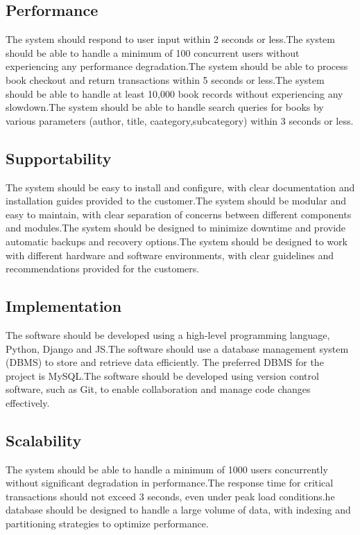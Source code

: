 \subsection{Performance}
The system should respond to user input within 2 seconds or less.The system should be able to handle a minimum of 100 concurrent users without experiencing any performance degradation.The system should be able to process book checkout and return transactions within 5 seconds or less.The system should be able to handle at least 10,000 book records without experiencing any slowdown.The system should be able to handle search queries for books by various parameters (author, title, caategory,subcategory) within 3 seconds or less.

\subsection{Supportability}

The system should be easy to install and configure, with clear documentation and installation guides provided to the customer.The system should be modular and easy to maintain, with clear separation of concerns between different components and modules.The system should be designed to minimize downtime and provide automatic backups and recovery options.The system should be designed to work with different hardware and software environments, with clear guidelines and recommendations provided for the customers.

\subsection{Implementation}
The software should be developed using a high-level programming language,  Python, Django and JS.The software should use a database management system (DBMS) to store and retrieve data efficiently. The preferred DBMS for the project is MySQL.The software should be developed using version control software, such as Git, to enable collaboration and manage code changes effectively.
\subsection{Scalability}
The system should be able to handle a minimum of 1000 users concurrently without significant degradation in performance.The response time for critical transactions should not exceed 3 seconds, even under peak load conditions.he database should be designed to handle a large volume of data, with indexing and partitioning strategies to optimize performance.

